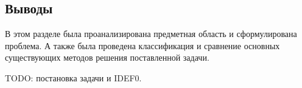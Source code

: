 
\subsection*{Выводы}

В этом разделе была проанализирована предметная область и сформулирована проблема. А также была проведена классификация и сравнение основных существующих методов решения поставленной задачи.

TODO: постановка задачи и IDEF0.


